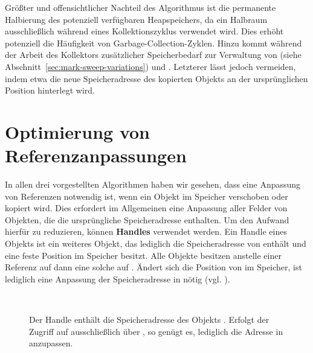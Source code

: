 Größter und offensichtlicher Nachteil des Algorithmus ist die permanente Halbierung des potenziell verfügbaren Heapspeichers, da ein Halbraum ausschließlich während eines Kollektionszyklus verwendet wird.
Dies erhöht potenziell die Häufigkeit von Garbage-Collection-Zyklen.
Hinzu kommt während der Arbeit des Kollektors zusätzlicher Speicherbedarf zur Verwaltung von  (siehe Abschnitt~\ref{sec:mark-sweep-variations}) und .
Letzterer lässt jedoch vermeiden, indem etwa die neue Speicheradresse des kopierten Objekts an der ursprünglichen Position hinterlegt wird.




\section{Optimierung von Referenzanpassungen}
\label{sec:handle}
In allen drei vorgestellten Algorithmen haben wir gesehen, dass eine Anpassung von Referenzen notwendig ist, wenn ein Objekt im Speicher verschoben oder kopiert wird.
Dies erfordert im Allgemeinen eine Anpassung aller Felder von Objekten, die die ursprüngliche Speicheradresse enthalten.
Um den Aufwand hierfür zu reduzieren, können \textbf{Handles} verwendet werden.
Ein Handle  eines Objekts  ist ein weiteres Objekt, das lediglich die Speicheradresse von  enthält und eine feste Position im Speicher besitzt.
Alle Objekte besitzen anstelle einer Referenz auf  dann eine solche auf .
Ändert sich die Position von  im Speicher, ist lediglich eine Anpassung der Speicheradresse in  nötig (vgl. \cite{brooks1984}).

\begin{figure}[h]
	\centering
	~\hspace{1cm}~
	
	\caption[Handle zur indirekten Adressierung von Objekten]{Der Handle  enthält die Speicheradresse des Objekts . Erfolgt der Zugriff auf  ausschließlich über , so genügt es, lediglich die Adresse in  anzupassen.}
	\label{fig:handle}
\end{figure}

